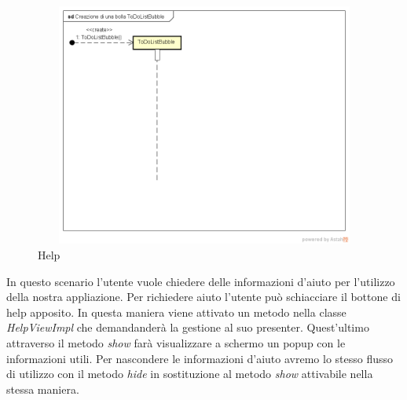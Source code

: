 \label{Help}
\begin{figure}[H]
	\centering
	\includegraphics[width=12cm, height=8cm]{Sezioni/Diagrammi/img/Creazione di una bolla ToDoListBubble.png}
	\caption{Help}
	
\end{figure}

In questo scenario l'utente vuole chiedere delle informazioni d'aiuto per l'utilizzo della nostra appliazione. Per richiedere aiuto l'utente può schiacciare il bottone di help apposito. In questa maniera viene attivato un metodo nella classe \textit{HelpViewImpl} che demandanderà la gestione al suo presenter. Quest'ultimo attraverso il metodo \textit{show} farà visualizzare a schermo un popup con le informazioni utili. Per nascondere le informazioni d'aiuto avremo lo stesso flusso di utilizzo con il metodo \textit{hide} in sostituzione al metodo \textit{show} attivabile nella stessa maniera.
